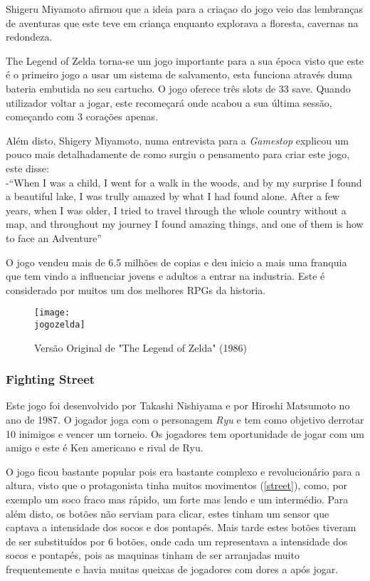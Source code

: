 \documentclass{report}
\begin{document}
Shigeru Miyamoto afirmou que a ideia para a criaçao do jogo veio das lembranças de aventuras que este teve em criança enquanto explorava a floresta, cavernas na redondeza.

The Legend of Zelda torna-se um jogo importante para a sua época visto que este é o primeiro jogo a usar um sistema de salvamento, esta funciona através duma bateria embutida no seu cartucho. O jogo oferece três slots de 33 save. Quando utilizador voltar a jogar, este recomeçará onde acabou a sua última sessão, começando com 3 corações apenas.

Além disto, Shigery Miyamoto, numa entrevista para a \textit{Gamestop} explicou um pouco mais detalhadamente de como surgiu o pensamento para criar este jogo, este disse:    \\     -“When I was a child, I went for a walk in the woods, and by my surprise I found a beautiful lake, I was trully amazed by what I had found alone. After a few years, when I was older, I tried to travel through the whole country without a map, and throughout my journey I found amazing things, and one of them is how to face an Adventure”

O jogo vendeu mais de 6.5 milhões de copias e deu inicio a mais uma franquia que tem vindo a influenciar jovens e adultos a entrar na industria. Este é considerado por muitos um dos melhores RPGs da historia. 

\begin{figure}[h]
\center
\texttt{[image: \\jogozelda]}
\caption{Versão Original de "The Legend of Zelda" (1986) \cite{legendofzelda}}
\label{Fig.5}
\end{figure}

\break
\subsubsection{Fighting Street}
\label{subsubsec.Fighting Street}
Este jogo foi desenvolvido por Takashi Nishiyama e por Hiroshi Matsumoto no ano de 1987. O jogador joga com o personagem \textit{Ryu} e tem como objetivo derrotar 10 inimigos e vencer um torneio. Os jogadores tem oportunidade de jogar com um amigo e este é Ken americano e rival de Ryu.

O jogo ficou bastante popular pois era bastante complexo e revolucionário para a altura, visto que o protagonista tinha muitos movimentos (\autoref{street}), como, por exemplo um soco fraco mas rápido, um forte mas lendo e um intermédio. Para além disto, os botões não serviam para clicar, estes tinham um sensor que captava a intensidade dos socos e dos pontapés. Mais tarde estes botões tiveram de ser substituídos por 6 botões, onde cada um representava a intensidade dos socos e pontapés, pois as maquinas tinham de ser arranjadas muito frequentemente e havia muitas queixas de jogadores com dores a após jogar.
\end{document}
